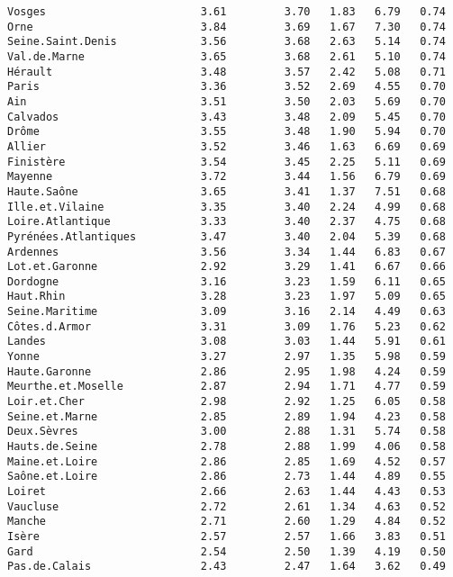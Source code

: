 \documentclass[11pt,a4paper]{article}\usepackage[]{graphicx}\usepackage[]{color}
\makeatletter
\newenvironment{kframe}{%
 \def\at@end@of@kframe{}%
 \ifinner\ifhmode%
  \def\at@end@of@kframe{\end{minipage}}%
  \begin{minipage}{\columnwidth}%
 \fi\fi%
 \def\FrameCommand##1{\hskip\@totalleftmargin \hskip-\fboxsep
 \colorbox{shadecolor}{##1}\hskip-\fboxsep
     \hskip-\linewidth \hskip-\@totalleftmargin \hskip\columnwidth}%
 \MakeFramed {\advance\hsize-\width
   \@totalleftmargin\z@ \linewidth\hsize
   \@setminipage}}%
 {\par\unskip\endMakeFramed%
 \at@end@of@kframe}
\newenvironment{knitrout}{}{} %
\makeatother
\begin{document}
\begin{knitrout}
\begin{kframe}
\begin{verbatim}
Vosges                        3.61         3.70   1.83   6.79   0.74
Orne                          3.84         3.69   1.67   7.30   0.74
Seine.Saint.Denis             3.56         3.68   2.63   5.14   0.74
Val.de.Marne                  3.65         3.68   2.61   5.10   0.74
Hérault                       3.48         3.57   2.42   5.08   0.71
Paris                         3.36         3.52   2.69   4.55   0.70
Ain                           3.51         3.50   2.03   5.69   0.70
Calvados                      3.43         3.48   2.09   5.45   0.70
Drôme                         3.55         3.48   1.90   5.94   0.70
Allier                        3.52         3.46   1.63   6.69   0.69
Finistère                     3.54         3.45   2.25   5.11   0.69
Mayenne                       3.72         3.44   1.56   6.79   0.69
Haute.Saône                   3.65         3.41   1.37   7.51   0.68
Ille.et.Vilaine               3.35         3.40   2.24   4.99   0.68
Loire.Atlantique              3.33         3.40   2.37   4.75   0.68
Pyrénées.Atlantiques          3.47         3.40   2.04   5.39   0.68
Ardennes                      3.56         3.34   1.44   6.83   0.67
Lot.et.Garonne                2.92         3.29   1.41   6.67   0.66
Dordogne                      3.16         3.23   1.59   6.11   0.65
Haut.Rhin                     3.28         3.23   1.97   5.09   0.65
Seine.Maritime                3.09         3.16   2.14   4.49   0.63
Côtes.d.Armor                 3.31         3.09   1.76   5.23   0.62
Landes                        3.08         3.03   1.44   5.91   0.61
Yonne                         3.27         2.97   1.35   5.98   0.59
Haute.Garonne                 2.86         2.95   1.98   4.24   0.59
Meurthe.et.Moselle            2.87         2.94   1.71   4.77   0.59
Loir.et.Cher                  2.98         2.92   1.25   6.05   0.58
Seine.et.Marne                2.85         2.89   1.94   4.23   0.58
Deux.Sèvres                   3.00         2.88   1.31   5.74   0.58
Hauts.de.Seine                2.78         2.88   1.99   4.06   0.58
Maine.et.Loire                2.86         2.85   1.69   4.52   0.57
Saône.et.Loire                2.86         2.73   1.44   4.89   0.55
Loiret                        2.66         2.63   1.44   4.43   0.53
Vaucluse                      2.72         2.61   1.34   4.63   0.52
Manche                        2.71         2.60   1.29   4.84   0.52
Isère                         2.57         2.57   1.66   3.83   0.51
Gard                          2.54         2.50   1.39   4.19   0.50
Pas.de.Calais                 2.43         2.47   1.64   3.62   0.49

\end{verbatim}
\end{kframe}
\end{knitrout}
\end{document}
